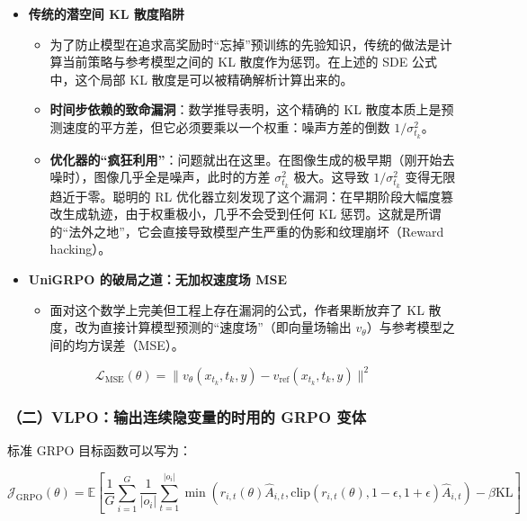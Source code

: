 \begin{itemize}
\tightlist
\item
  \textbf{传统的潜空间 KL 散度陷阱}

  \begin{itemize}
  \tightlist
  \item
    为了防止模型在追求高奖励时``忘掉''预训练的先验知识，传统的做法是计算当前策略与参考模型之间的 KL 散度作为惩罚。在上述的 SDE 公式中，这个局部 KL 散度是可以被精确解析计算出来的。
  \item
    \textbf{时间步依赖的致命漏洞}：数学推导表明，这个精确的 KL 散度本质上是预测速度的平方差，但它必须要乘以一个权重：噪声方差的倒数 \(1/\sigma_{t_k}^2\)。
  \item
    \textbf{优化器的``疯狂利用''}：问题就出在这里。在图像生成的极早期（刚开始去噪时），图像几乎全是噪声，此时的方差 \(\sigma_{t_k}^2\) 极大。这导致 \(1/\sigma_{t_k}^2\) 变得无限趋近于零。聪明的 RL 优化器立刻发现了这个漏洞：在早期阶段大幅度篡改生成轨迹，由于权重极小，几乎不会受到任何 KL 惩罚。这就是所谓的``法外之地''，它会直接导致模型产生严重的伪影和纹理崩坏（Reward hacking）。
  \end{itemize}
\item
  \textbf{UniGRPO 的破局之道：无加权速度场 MSE}

  \begin{itemize}
  \tightlist
  \item
    面对这个数学上完美但工程上存在漏洞的公式，作者果断放弃了 KL 散度，改为直接计算模型预测的``速度场''（即向量场输出 \(v_{\theta}\)）与参考模型之间的均方误差（MSE）。
  \end{itemize}
\end{itemize}

\[
\mathcal{L}_{\mathrm{MSE}}(\theta)
=\lVert v_{\theta}(x_{t_k},t_k,y)-v_{\mathrm{ref}}(x_{t_k},t_k,y)\rVert^2
\]

\hypertarget{ux4e8cvlpoux8f93ux51faux8fdeux7eedux9690ux53d8ux91cfux7684ux65f6ux7528ux7684-grpo-ux53d8ux4f53}{%
\subsubsection{（二）VLPO：输出连续隐变量的时用的 GRPO 变体}\label{ux4e8cvlpoux8f93ux51faux8fdeux7eedux9690ux53d8ux91cfux7684ux65f6ux7528ux7684-grpo-ux53d8ux4f53}}

标准 GRPO 目标函数可以写为：

\[
\mathcal{J}_{\mathrm{GRPO}}(\theta)=
\mathbb{E}\left[
\frac{1}{G}\sum_{i=1}^{G}\frac{1}{|o_i|}
\sum_{t=1}^{|o_i|}
\min\left(
r_{i,t}(\theta)\hat A_{i,t},
\mathrm{clip}(r_{i,t}(\theta),1-\epsilon,1+\epsilon)\hat A_{i,t}
\right)
-\beta\mathrm{KL}
\right]
\]


